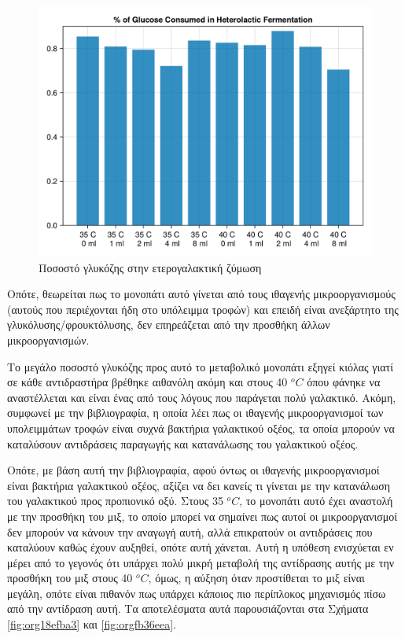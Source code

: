 \documentclass[11pt]{report}
\begin{document}
\begin{figure}[htbp]
\centering
\includegraphics[width=.9\linewidth]{../plots/metabolic_results/heterolactate_flux.png}
\caption{\label{fig:orgf117c61}Ποσοστό γλυκόζης στην ετερογαλακτική ζύμωση}
\end{figure}

Οπότε, θεωρείται πως το μονοπάτι αυτό γίνεται από τους ιθαγενής μικροοργανισμούς (αυτούς που περιέχονται ήδη στο υπόλειμμα τροφών) και επειδή είναι ανεξάρτητο της γλυκόλυσης/φρουκτόλυσης, δεν επηρεάζεται από την προσθήκη άλλων μικροοργανισμών.

Το μεγάλο ποσοστό γλυκόζης προς αυτό το μεταβολικό μονοπάτι εξηγεί κιόλας γιατί σε κάθε αντιδραστήρα βρέθηκε αιθανόλη ακόμη και στους 40 \(^oC\) όπου φάνηκε να αναστέλλεται και είναι ένας από τους λόγους που παράγεται πολύ γαλακτικό. Ακόμη, συμφωνεί με την βιβλιογραφία, η οποία λέει πως οι ιθαγενής μικροοργανισμοί των υπολειμμάτων τροφών είναι συχνά βακτήρια γαλακτικού οξέος, τα οποία μπορούν να καταλύσουν αντιδράσεις παραγωγής και κατανάλωσης του γαλακτικού οξέος.

Οπότε, με βάση αυτή την βιβλιογραφία, αφού όντως οι ιθαγενής μικροοργανισμοί είναι βακτήρια γαλακτικού οξέος, αξίζει να δει κανείς τι γίνεται με την κατανάλωση του γαλακτικού προς προπιονικό οξύ. Στους 35 \(^oC\), το μονοπάτι αυτό έχει αναστολή με την προσθήκη του μιξ, το οποίο μπορεί να σημαίνει πως αυτοί οι μικροοργανισμοί δεν μπορούν να κάνουν την αναγωγή αυτή, αλλά επικρατούν οι αντιδράσεις που καταλύουν καθώς έχουν αυξηθεί, οπότε αυτή χάνεται. Αυτή η υπόθεση ενισχύεται εν μέρει από το γεγονός ότι υπάρχει πολύ μικρή μεταβολή της αντίδρασης αυτής με την προσθήκη του μιξ στους 40 \(^oC\), όμως, η αύξηση όταν προστίθεται το μιξ είναι μεγάλη, οπότε είναι πιθανόν πως υπάρχει κάποιος πιο περίπλοκος μηχανισμός πίσω από την αντίδραση αυτή. Τα αποτελέσματα αυτά παρουσιάζονται στα Σχήματα \ref{fig:org18efba3} και \ref{fig:orgfb36eea}. 
\end{document}
